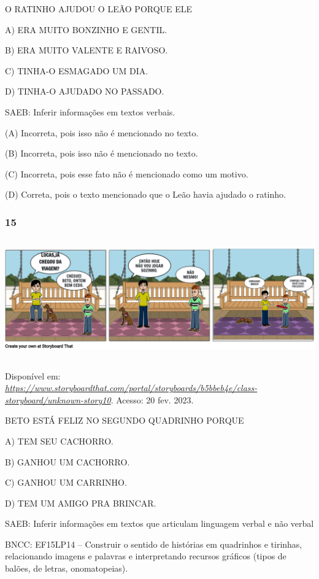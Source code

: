O RATINHO AJUDOU O LEÃO PORQUE ELE

A) ERA MUITO BONZINHO E GENTIL.

B) ERA MUITO VALENTE E RAIVOSO.

C) TINHA-O ESMAGADO UM DIA.

D) TINHA-O AJUDADO NO PASSADO.

SAEB: Inferir informações em textos verbais.

\protect\hypertarget{_heading=h.37m2jsg}{}{}(A) Incorreta, pois isso não é
mencionado no texto.

(B) Incorreta, pois isso não é mencionado no texto.

(C) Incorreta, pois esse fato não é mencionado como um motivo.

(D) Correta, pois o texto mencionado que o Leão havia ajudado o ratinho.

\subsubsection{15}\label{section-55}

\includegraphics[width=6.13750in,height=2.02917in]{media/image221.png}

Disponível em:
\href{https://www.storyboardthat.com/portal/storyboards/b5bbeb4e/class-storyboard/unknown-story10}{\emph{https://www.storyboardthat.com/portal/storyboards/b5bbeb4e/class-storyboard/unknown-story10}}.
Acesso: 20 fev. 2023.

BETO ESTÁ FELIZ NO SEGUNDO QUADRINHO PORQUE

A) TEM SEU CACHORRO.

B) GANHOU UM CACHORRO.

C) GANHOU UM CARRINHO.

D) TEM UM AMIGO PRA BRINCAR.

SAEB: Inferir informações em textos que articulam linguagem
verbal e não verbal

BNCC: EF15LP14 -- Construir o sentido de histórias em quadrinhos e tirinhas, relacionando imagens e palavras e interpretando recursos gráficos (tipos de balões, de letras, onomatopeias).

